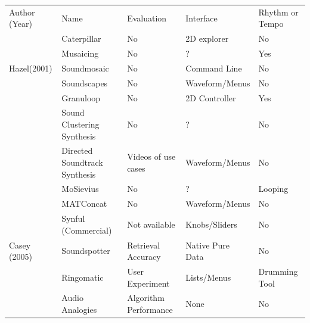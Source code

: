 \begin{table}
	\begin{threeparttable} 
		\begin{centering}
			\begin{tabular}{l l l l l}
				\tabletop
				Author (Year) & Name & Evaluation & Interface & Rhythm or Tempo\\
				\tablemid			
				\cite{Schwarz2000}                & Caterpillar                   & No                     & 2D explorer                  & No             \\
				\cite{Zils2001}         & Musaicing                     & No                     & ?                            & Yes            \\
				Hazel(2001)               & Soundmosaic                   & No                     & Command Line                 & No             \\
				\cite{Hoskinson2001}      & Soundscapes                   & No                     & Waveform/Menus               & No             \\
				\cite{Xiang2002}          & Granuloop                     & No                     & 2D Controller                & Yes            \\
				\cite{Kobayashi}          & Sound Clustering Synthesis    & No                     & ?                            & No             \\
				\cite{Cardle2003}         & Directed Soundtrack Synthesis & Videos of use cases    & Waveform/Menus               & No             \\
				\cite{Lazier2003}         & MoSievius                     & No                     & ?                            & Looping        \\
				\cite{Sturm2004}          & MATConcat                     & No                     & Waveform/Menus               & No             \\
				\cite{Lindemann2007}		& Synful (Commercial)           & Not available          & Knobs/Sliders                & No             \\
				Casey (2005)                  & Soundspotter                  & Retrieval Accuracy     & Native Pure Data             & No             \\
				\cite{Aucouturier2005} & Ringomatic                    & User Experiment        & Lists/Menus                  & Drumming Tool  \\
				\cite{Simon2005}          & Audio Analogies               & Algorithm Performance  & None                         & No             \\

\end{tabular}
\end{centering}
\end{threeparttable}
\end{table}
